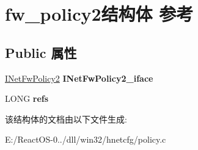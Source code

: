 \hypertarget{structfw__policy2}{}\section{fw\+\_\+policy2结构体 参考}
\label{structfw__policy2}
\subsection*{Public 属性}
\begin{DoxyCompactItemize}
\item 
\mbox{\label{structfw__policy2_acfdd8786f3df5354f147347ad7b8f089}} 
\hyperlink{interface_i_net_fw_policy2}{I\+Net\+Fw\+Policy2} {\bfseries I\+Net\+Fw\+Policy2\+\_\+iface}
\item 
\mbox{\label{structfw__policy2_aa441e5a2aa656b8eb656cf9c21141e10}} 
L\+O\+NG {\bfseries refs}
\end{DoxyCompactItemize}


该结构体的文档由以下文件生成\+:\begin{DoxyCompactItemize}
\item 
E\+:/\+React\+O\+S-\/0../dll/win32/hnetcfg/policy.\+c\end{DoxyCompactItemize}
